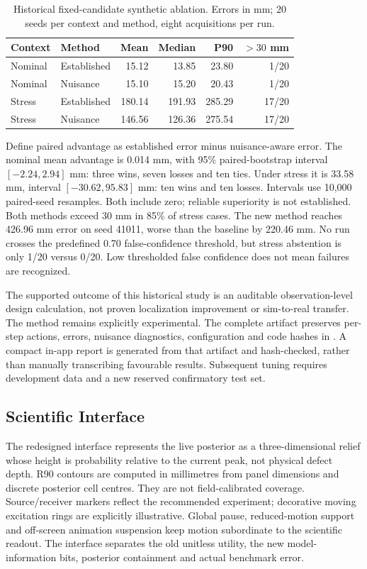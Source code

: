\begin{table}[t]
\centering
\caption{Historical fixed-candidate synthetic ablation. Errors in mm;
20 seeds per context and method, eight acquisitions per run.}
\label{tab:nuisance-design}
\setlength{\tabcolsep}{3pt}
\small
\begin{tabular}{@{}llrrrr@{}}
\toprule
Context & Method & Mean & Median & P90 & $>30$ mm\\
\midrule
Nominal & Established & 15.12 & 13.85 & 23.80 & 1/20\\
Nominal & Nuisance & 15.10 & 15.20 & 20.43 & 1/20\\
Stress & Established & 180.14 & 191.93 & 285.29 & 17/20\\
Stress & Nuisance & 146.56 & 126.36 & 275.54 & 17/20\\
\bottomrule
\end{tabular}
\end{table}

Define paired advantage as established error minus nuisance-aware error.
The nominal mean advantage is 0.014 mm, with 95\% paired-bootstrap interval
$[-2.24,2.94]$ mm: three wins, seven losses and ten ties. Under stress it is
33.58 mm, interval $[-30.62,95.83]$ mm: ten wins and ten losses. Intervals use
10,000 paired-seed resamples. Both include zero; reliable superiority is not
established. Both methods exceed 30 mm in 85\% of stress cases. The new method
reaches 426.96 mm error on seed 41011, worse than the baseline by 220.46 mm.
No run crosses the predefined 0.70 false-confidence threshold, but stress
abstention is only 1/20 versus 0/20. Low thresholded false confidence does not
mean failures are recognized.

The supported outcome of this historical study is an auditable observation-level design calculation,
not proven localization improvement or sim-to-real transfer. The method remains
explicitly experimental. The complete artifact preserves per-step actions,
errors, nuisance diagnostics, configuration and code hashes in
. A compact in-app
report is generated from that artifact and hash-checked, rather than manually
transcribing favourable results. Subsequent tuning requires development data
and a new reserved confirmatory test set.

\subsection{Scientific Interface}
The redesigned interface represents the live posterior as a three-dimensional
relief whose height is probability relative to the current peak, not physical
defect depth. R90 contours are computed in millimetres from panel dimensions
and discrete posterior cell centres. They are not field-calibrated coverage.
Source/receiver markers reflect the recommended experiment; decorative moving
excitation rings are explicitly illustrative. Global pause, reduced-motion
support and off-screen animation suspension keep motion subordinate to the
scientific readout. The interface separates the old unitless utility, the new
model-information bits, posterior containment and actual benchmark error.
